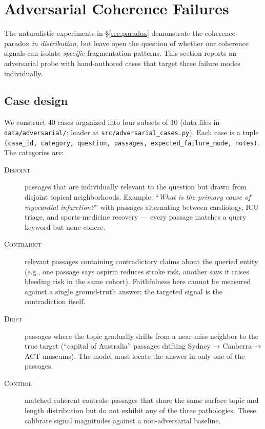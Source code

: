\section{Adversarial Coherence Failures}
\label{sec:adversarial}

The naturalistic experiments in §\ref{sec:paradox} demonstrate the
coherence paradox \emph{in distribution}, but leave open the question of
whether our coherence signals can isolate \emph{specific} fragmentation
patterns. This section reports an adversarial probe with hand-authored
cases that target three failure modes individually.

\subsection{Case design}

We construct 40 cases organized into four subsets of 10 (data files in
\texttt{data/adversarial/}; loader at \texttt{src/adversarial\_cases.py}).
Each case is a tuple \texttt{(case\_id, category, question, passages,
expected\_failure\_mode, notes)}. The categories are:

\begin{description}
  \item[\textsc{Disjoint}] passages that are individually relevant to the
        question but drawn from disjoint topical neighborhoods. Example:
        ``\emph{What is the primary cause of myocardial infarction?}''
        with passages alternating between cardiology, ICU triage, and
        sports-medicine recovery — every passage matches a query keyword
        but none cohere.
  \item[\textsc{Contradict}] relevant passages containing contradictory
        claims about the queried entity (e.g., one passage says aspirin
        reduces stroke risk, another says it raises bleeding risk in the
        same cohort). Faithfulness here cannot be measured against a
        single ground-truth answer; the targeted signal is the
        contradiction itself.
  \item[\textsc{Drift}] passages where the topic gradually drifts from a
        near-miss neighbor to the true target (``capital of Australia''
        passages drifting Sydney → Canberra → ACT museums). The model
        must locate the answer in only one of the passages.
  \item[\textsc{Control}] matched coherent controls: passages that share
        the same surface topic and length distribution but do not exhibit
        any of the three pathologies. These calibrate signal magnitudes
        against a non-adversarial baseline.
\end{description}

